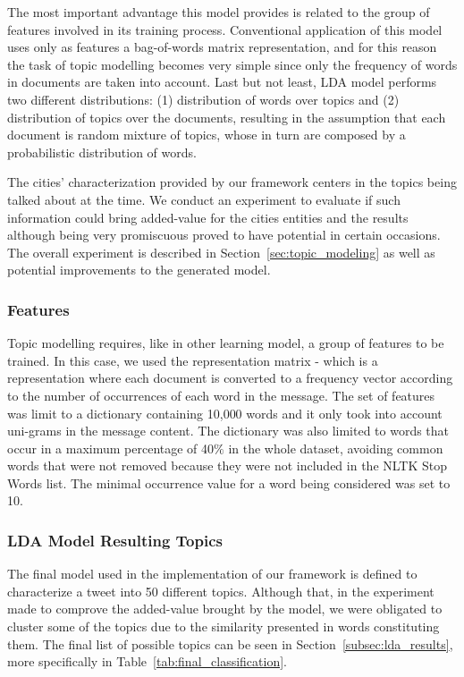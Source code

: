 The most important advantage this model provides is related to the group of features involved in its training process. Conventional application of this model uses only as features a bag-of-words matrix representation, and for this reason the task of topic modelling becomes very simple since only the frequency of words in documents are taken into account. Last but not least, \gls{LDA} model performs two different distributions: (1) distribution of words over topics and (2) distribution of topics over the documents, resulting in the assumption that each document is random mixture of topics, whose in turn are composed by a probabilistic distribution of words.

The cities' characterization provided by our framework centers in the topics being talked about at the time. We conduct an experiment to evaluate if such information could bring added-value for the cities entities and the results although being very promiscuous proved to have potential in certain occasions. The overall experiment is described in Section~\ref{sec:topic_modeling} as well as potential improvements to the generated model.

\subsubsection{Features}
Topic modelling requires, like in other learning model, a group of features to be trained. In this case, we used the  representation matrix - which is a representation where each document is converted to a frequency vector according to the number of occurrences of each word in the message. The set of features was limit to a dictionary containing 10,000 words and it only took into account uni-grams in the message content. The dictionary was also limited to words that occur in a maximum percentage of 40$\%$ in the whole dataset, avoiding common words that were not removed because they were not included in the NLTK Stop Words list. The minimal occurrence value for a word being considered was set to 10.

\subsubsection{LDA Model Resulting Topics}
The final model used in the implementation of our framework is defined to characterize a tweet into 50 different topics. Although that, in the experiment made to comprove the added-value brought by the model,  we were obligated to cluster some of the topics due to the similarity presented in words constituting them. The final list of possible topics can be seen in Section~\ref{subsec:lda_results}, more specifically in Table~\ref{tab:final_classification}.


